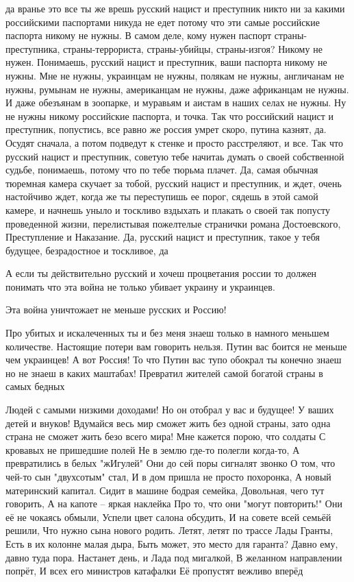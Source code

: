 да вранье это все ты же врешь русский нацист и преступник никто ни за какими
российскими паспортами никуда не едет потому что эти самые российские паспорта
никому не нужны. В самом деле, кому нужен паспорт страны-преступника,
страны-террориста, страны-убийцы, страны-изгоя? Никому не нужен. Понимаешь,
русский нацист и преступник, ваши паспорта никому не нужны. Мне не нужны,
украинцам не нужны, полякам не нужны, англичанам не нужны, румынам не нужны,
американцам не нужны, даже африканцам не нужны. И даже обезъянам в зоопарке, и
муравьям и аистам в наших селах не нужны. Ну не нужны никому российские
паспорта, и точка. Так что российский нацист и преступник, попустись, все равно
же россия умрет скоро, путина казнят, да. Осудят сначала, а потом подведут к
стенке и просто расстреляют, и все. Так что русский нацист и преступник,
советую тебе начитаь думать о своей собственной судьбе, понимаешь, потому что
по тебе тюрьма плачет. Да, самая обычная тюремная камера скучает за тобой,
русский нацист и преступник, и ждет, очень настойчиво ждет, когда же ты
переступишь ее порог, сядешь в этой самой камере, и начнешь уныло и тоскливо
вздыхать и плакать о своей так попусту проведенной жизни, перелистывая
пожелтелые странички романа Достоевского, Преступление и Наказание. Да, русский
нацист и преступник, такое у тебя будущее, безрадостное и тоскливое, да

А если ты действительно русский и хочеш процветания россии то должен понимать
что эта война не только убивает украину и украинцев.

Эта война уничтожает не меньше русских и Россию!

Про убитых и искалеченных ты и без меня знаеш только в намного меньшем
количестве. Настоящие потери вам говорить нельзя. Путин вас боится не меньше
чем украинцев! А вот Россия! То что Путин вас тупо обокрал ты конечно знаеш но
не знаеш в каких маштабах! Превратил жителей самой богатой страны в самых
бедных

Людей с самыми низкими доходами! Но он отобрал у вас и будущее! У ваших детей и
внуков! Вдумайся весь мир сможет жить без одной страны, зато одна страна не
сможет жить безо всего мира!
Мне кажется порою, что солдаты
С кровавых не пришедшие полей
Не в землю где-то полегли когда-то,
А превратились в белых "жИгулей"
Они до сей поры сигналят звонко
О том, что чей-то сын "двухсотым" стал,
И в дом пришла не просто похоронка,
А новый материнский капитал.
Сидит в машине бодрая семейка,
Довольная, чего тут говорить,
А на капоте – яркая наклейка
Про то, что они "могут повторить!"
Они её не чокаясь обмыли,
Успели цвет салона обсудить,
И на совете всей семьёй решили,
Что нужно сына нового родить.
Летят, летят по трассе Лады Гранты,
Есть в их колонне малая дыра,
Быть может, это место для гаранта?
Давно ему, давно туда пора.
Настанет день, и Лада под мигалкой,
В желанном направлении попрёт,
И всех его министров катафалки
Её пропустят вежливо вперёд


